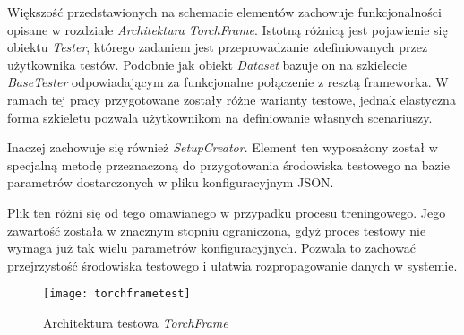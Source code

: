     Większość przedstawionych na schemacie elementów zachowuje funkcjonalności
    opisane w rozdziale \textit{Architektura TorchFrame}. Istotną różnicą jest
    pojawienie się obiektu \textit{Tester}, którego zadaniem jest przeprowadzanie
    zdefiniowanych przez użytkownika testów. Podobnie jak obiekt \textit{Dataset} bazuje
    on na szkielecie \textit{BaseTester} odpowiadającym za funkcjonalne połączenie z
    resztą frameworka. W ramach tej pracy przygotowane zostały różne warianty
    testowe, jednak elastyczna forma szkieletu pozwala użytkownikom
    na definiowanie własnych scenariuszy.

    Inaczej zachowuje się również \textit{SetupCreator}. Element ten wyposażony został w specjalną
    metodę przeznaczoną do przygotowania środowiska testowego na bazie parametrów
    dostarczonych w pliku konfiguracyjnym JSON.

    Plik ten różni się od tego omawianego w przypadku procesu treningowego. Jego
    zawartość została w znacznym stopniu ograniczona, gdyż proces testowy nie
    wymaga już tak wielu parametrów konfiguracyjnych. Pozwala to zachować
    przejrzystość środowiska testowego i ułatwia rozpropagowanie danych
    w systemie.

    \begin{figure}[h!]
      \centering
      \texttt{[image: torchframetest]}
      \caption[Architektura testowa \textit{TorchFrame} - źródło: Rysunek własny]{Architektura testowa \textit{TorchFrame}}
      \label{fig:torchframetest}
    \end{figure}

